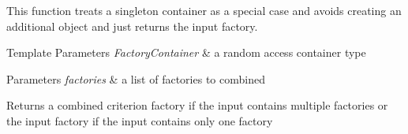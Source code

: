 This function treats a singleton container as a special case and avoids creating an additional object and just returns the input factory.


\begin{DoxyTemplParams}{Template Parameters}
{\em Factory\+Container} & a random access container type\\
\hline
\end{DoxyTemplParams}

\begin{DoxyParams}{Parameters}
{\em factories} & a list of factories to combined\\
\hline
\end{DoxyParams}
\begin{DoxyReturn}{Returns}
a combined criterion factory if the input contains multiple factories or the input factory if the input contains only one factory 
\end{DoxyReturn}
